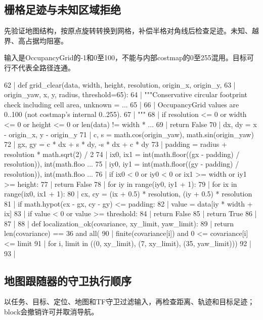 \subsection{栅格足迹与未知区域拒绝}
先验证地图结构，按原点旋转转换到网格，补偿半格对角线后检查足迹。未知、越界、高占据均阻塞。

输入是OccupancyGrid的-1和0至100，不能与内部costmap的0至255混用。目标可行不代表全路径连通。
\begin{CodeBlock}
  62 | def grid_clear(data, width, height, resolution, origin_x, origin_y,
  63 |                origin_yaw, x, y, radius, threshold=65):
  64 |     """Conservative circular footprint check including cell area, unknown = ...
  65 | 
  66 |     OccupancyGrid values are 0..100 (not costmap's internal 0..255).
  67 |     """
  68 |     if resolution <= 0 or width <= 0 or height <= 0 or len(data) != width * ...
  69 |         return False
  70 |     dx, dy = x - origin_x, y - origin_y
  71 |     c, s = math.cos(origin_yaw), math.sin(origin_yaw)
  72 |     gx, gy = c * dx + s * dy, -s * dx + c * dy
  73 |     padding = radius + resolution * math.sqrt(2) / 2
  74 |     ix0, ix1 = int(math.floor((gx - padding) / resolution)), int(math.floo  ...
  75 |     iy0, iy1 = int(math.floor((gy - padding) / resolution)), int(math.floo  ...
  76 |     if ix0 < 0 or iy0 < 0 or ix1 >= width or iy1 >= height:
  77 |         return False
  78 |     for iy in range(iy0, iy1 + 1):
  79 |         for ix in range(ix0, ix1 + 1):
  80 |             cx, cy = (ix + 0.5) * resolution, (iy + 0.5) * resolution
  81 |             if math.hypot(cx - gx, cy - gy) <= padding:
  82 |                 value = data[iy * width + ix]
  83 |                 if value < 0 or value >= threshold:
  84 |                     return False
  85 |     return True
  86 | 
  87 | 
  88 | def localization_ok(covariance, xy_limit, yaw_limit):
  89 |     return len(covariance) == 36 and all(
  90 |         finite(covariance[i]) and 0 <= covariance[i] <= limit
  91 |         for i, limit in ((0, xy_limit), (7, xy_limit), (35, yaw_limit)))
  92 | 
  93 | 
\end{CodeBlock}
\subsection{地图跟随器的守卫执行顺序}
以任务、目标、定位、地图和TF守卫过滤输入，再检查距离、轨迹和目标足迹；block会撤销许可并取消导航。

